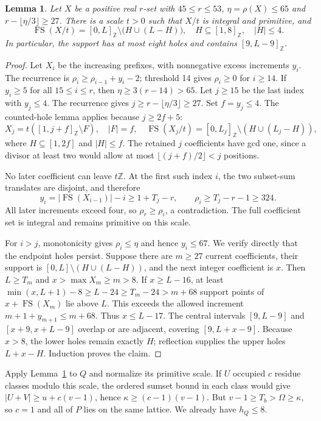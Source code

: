 \documentclass[11pt,a4paper]{article}
\newtheorem{lemma}[theorem]{Lemma}
\theoremstyle{remark}
\newcommand{\FS}{\operatorname{FS}}
\newcommand{\Z}{\mathbb Z}
\begin{document}
\begin{lemma}\label{u86:lem:dense89}
Let $X$ be a positive real $r$-set with $45\le r\le53$,
$\eta=\rho(X)\le65$ and $r-\lfloor\eta/3\rfloor\ge27$.
There is a scale $t>0$ such that $X/t$ is integral and primitive, and
\[
 \FS(X/t)=[0,L]_{\Z}\setminus\bigl(H\cup(L-H)\bigr),
 \quad H\subseteq[1,8]_{\Z},\quad |H|\le4.
\]
In particular, the support has at most eight holes and contains
$[9,L-9]_{\Z}$.
\end{lemma}
\begin{proof}
Let $X_i$ be the increasing prefixes, with nonnegative excess increments
$y_i$. The recurrence is $\rho_i\ge\rho_{i-1}+y_i-2$;
threshold 14 gives $\rho_i\ge0$ for $i\ge14$.
If $y_i\ge5$ for all $15\le i\le r$, then
$\eta\ge3(r-14)>65$. Let $j\ge15$ be the last index with $y_j\le4$.
The recurrence gives $j\ge r-\lfloor\eta/3\rfloor\ge27$.
Set $f=y_j\le4$. The counted-hole lemma applies because $j\ge2f+5$:
\[
 X_j=t([1,j+f]_{\Z}\setminus F),\quad |F|=f,
 \quad \FS(X_j/t)=[0,L_j]_{\Z}\setminus(H\cup(L_j-H)),
\]
where $H\subseteq[1,2f]$ and $|H|\le f$.
The retained $j$ coefficients have gcd one, since a divisor at least two
would allow at most $\lfloor(j+f)/2\rfloor<j$ positions.

No later coefficient can leave $t\Z$. At the first such index $i$,
the two subset-sum translates are disjoint, and therefore
\[
 y_i=|\FS(X_{i-1})|-i\ge1+T_j-r,
 \qquad \rho_i\ge T_j-r-1\ge324.
\]
All later increments exceed four, so $\rho_r\ge\rho_i$, a contradiction.
The full coefficient set is integral and remains primitive on this scale.

For $i>j$, monotonicity gives $\rho_i\le\eta$ and hence $y_i\le67$.
We verify directly that the endpoint holes persist. Suppose there are
$m\ge27$ current coefficients, their support is
$[0,L]\setminus(H\cup(L-H))$, and the next integer coefficient is $x$.
Then $L\ge T_m$ and $x>\max X_m\ge m>8$.
If $x\ge L-16$, at least
$\min(x,L+1)-8\ge L-24\ge T_m-24>m+68$ support points of
$x+\FS(X_m)$ lie above $L$. This exceeds the allowed increment
$m+1+y_{m+1}\le m+68$. Thus $x\le L-17$.
The central intervals $[9,L-9]$ and $[x+9,x+L-9]$ overlap or are adjacent,
covering $[9,L+x-9]$. Because $x>8$, the lower holes remain exactly $H$;
reflection supplies the upper holes $L+x-H$. Induction proves the claim.
\end{proof}

Apply Lemma~\ref{u86:lem:dense89} to $Q$ and normalize its primitive scale.
If $U$ occupied $c$ residue classes modulo this scale, the ordered
sumset bound in each class would give
$|U+V|\ge u+c(v-1)$, hence $\kappa\ge(c-1)(v-1)$.
But $v-1\ge T_b>\Omega\ge\kappa$, so $c=1$ and all of $P$ lies
on the same lattice. We already have $h_Q\le8$.
\end{document}

